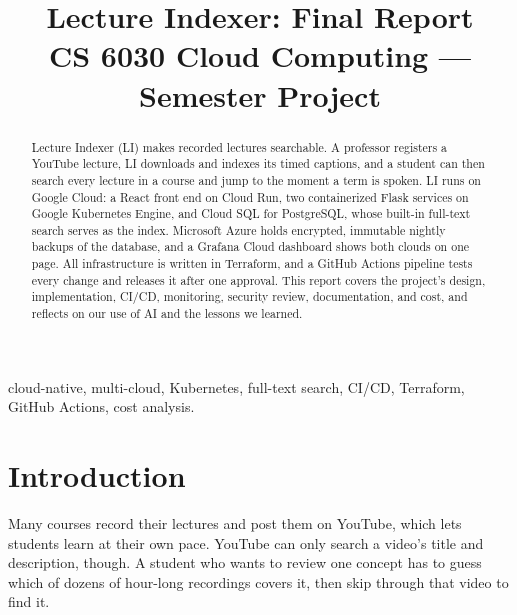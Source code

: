 \documentclass[conference]{IEEEtran}
\begin{document}
\title{Lecture Indexer: Final Report\\[0.4ex]
{\large CS 6030 Cloud Computing --- Semester Project}}

\author{
\and
{}
\and
{}
}

\maketitle

\begin{abstract}
Lecture Indexer (LI) makes recorded lectures searchable. A professor
registers a YouTube lecture, LI downloads and indexes its timed captions,
and a student can then search every lecture in a course and jump to the
moment a term is spoken. LI runs on Google Cloud: a React front end on
Cloud Run, two containerized Flask services on Google Kubernetes Engine,
and Cloud SQL for PostgreSQL, whose built-in full-text search serves as
the index. Microsoft Azure holds encrypted, immutable nightly backups of
the database, and a Grafana Cloud dashboard shows both clouds on one page.
All infrastructure is written in Terraform, and a GitHub Actions pipeline
tests every change and releases it after one approval. This report covers
the project's design, implementation, CI/CD, monitoring, security review,
documentation, and cost, and reflects on our use of AI and the lessons
we learned.
\end{abstract}

\begin{IEEEkeywords}
cloud-native, multi-cloud, Kubernetes, full-text search, CI/CD,
Terraform, GitHub Actions, cost analysis.
\end{IEEEkeywords}

\section{Introduction}
Many courses record their lectures and post them on YouTube, which lets
students learn at their own pace. YouTube can only search a video's title
and description, though. A student who wants to review one concept has to
guess which of dozens of hour-long recordings covers it, then skip through
that video to find it.
\end{document}

